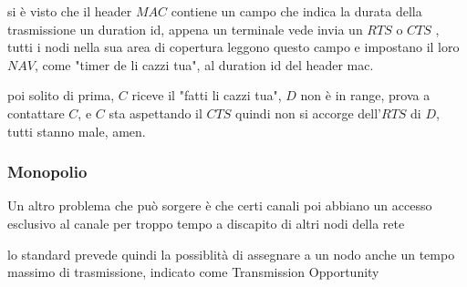 \documentclass[11pt]{article}
\begin{document}
si è visto che il header \(MAC\) contiene un campo che indica la durata della trasmissione un duration id, appena un terminale vede invia un \(RTS\) o \(CTS\) , tutti i nodi nella sua area di copertura leggono questo campo e impostano il loro \(NAV\), come "timer de li cazzi tua", al duration id del header mac.

poi solito di prima, \(C\) riceve il "fatti li cazzi tua", \(D\) non è in range, prova a contattare \(C\), e \(C\) sta aspettando il \(CTS\) quindi non si accorge dell'\(RTS\) di \(D\), tutti stanno male, amen.

\subsubsection{Monopolio}
\label{sec:org1eb7961}
Un altro problema che può sorgere è che certi canali poi abbiano un accesso esclusivo al canale per troppo tempo a discapito di altri nodi della rete

lo standard prevede quindi la possiblità di assegnare a un nodo anche un tempo massimo di trasmissione, indicato come Transmission Opportunity
\end{document}
